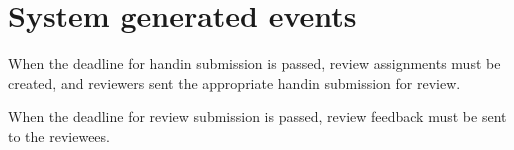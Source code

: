 \documentclass[Main]{subfiles}
\begin{document}
\section{System generated events}\label{sec:SysGenEvents}

\begin{EventTable}
\Record
{When the deadline for handin submission is passed, review assignments must be created, and reviewers sent the appropriate handin submission for review.}{}{}

\Record
{When the deadline for review submission is passed, review feedback must be sent to the reviewees.}{}{}

\end{EventTable}
\end{document}
